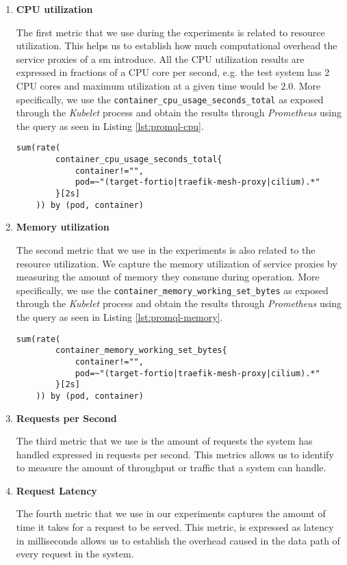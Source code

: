 \begin{enumerate}[label=\textbf{M\arabic*}, leftmargin=3\parindent]
    \item \textbf{CPU utilization}
    \label{exp:metric:1}
    
    The first metric that we use during the experiments is related to resource utilization. This helps us to establish how much computational overhead the service proxies of a \gls{sm} introduce. All the CPU utilization results are expressed in fractions of a CPU core per second, e.g. the test system has 2 CPU cores and maximum utilization at a given time would be $2.0$. More specifically, we use the \Verb+container_cpu_usage_seconds_total+ as exposed through the \textit{Kubelet} process and obtain the results through \textit{Prometheus} using the query as seen in Listing \ref{lst:promql-cpu}.
    
    \begin{lstlisting}[caption=PromQL query for CPU metric, label=lst:promql-cpu] 
    sum(rate(
        container_cpu_usage_seconds_total{
            container!="",
            pod=~"(target-fortio|traefik-mesh-proxy|cilium).*"
        }[2s]
    )) by (pod, container)
    \end{lstlisting}

    
    \item \textbf{Memory utilization}
    \label{exp:metric:2}
    
    The second metric that we use in the experiments is also related to the resource utilization. We capture the memory utilization of service proxies by measuring the amount of memory they consume during operation. More specifically, we use the \Verb+container_memory_working_set_bytes+ as exposed through the \textit{Kubelet} process and obtain the results through \textit{Prometheus} using the query as seen in Listing \ref{lst:promql-memory}.
    
    
    \begin{lstlisting}[caption=PromQL query for CPU metric, label=lst:promql-memory] 
    sum(rate(
        container_memory_working_set_bytes{
            container!="",
            pod=~"(target-fortio|traefik-mesh-proxy|cilium).*"
        }[2s]
    )) by (pod, container)
    \end{lstlisting}

    
    \item \textbf{Requests per Second}
    \label{exp:metric:3}
    
    The third metric that we use is the amount of requests the system has handled expressed in requests per second. This metrics allows us to identify to measure the amount of throughput or traffic that a system can handle. 

    \item \textbf{Request Latency}
    \label{exp:metric:4}
    
    The fourth metric that we use in our experiments captures the amount of time it takes for a request to be served. This metric, is expressed as latency in milliseconds allows us to establish the overhead caused in the data path of every request in the system.

\end{enumerate}

